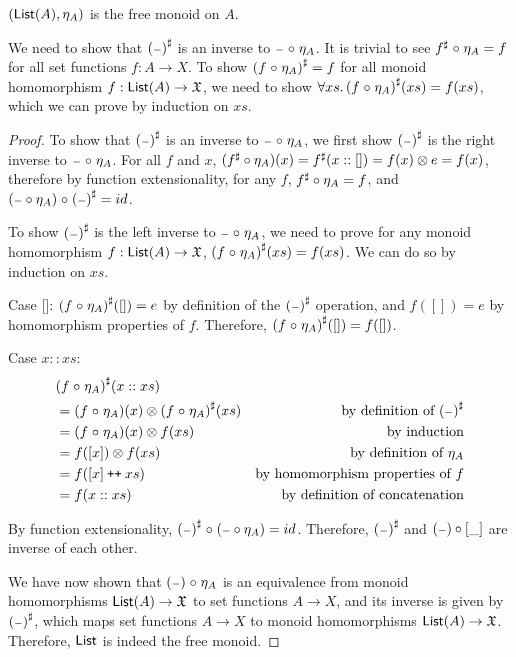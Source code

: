 \begin{propositionrep}
    $(\operatorname{\mathsf{List}}(A),\eta_A)$ is the free monoid on $A$.
\end{propositionrep}

\begin{proofsketch}
    We need to show that ${({\scriptstyle{-}})}^{\sharp}$ is an inverse to ${\scriptstyle{-}} \mathrel{\circ} \eta_A$.
    It is trivial to see ${f}^{\sharp} \mathrel{\circ} \eta_A = f$ for all set functions $f : A \to X$.
    To show ${(f \mathrel{\circ} \eta_A)}^{\sharp} = f$ for all monoid homomorphism $f : \operatorname{\mathsf{List}}(A) \to \mathfrak{X}$,
    we need to show $\forall xs.\, {(f \mathrel{\circ} \eta_A)}^{\sharp}(xs) = f(xs)$, which we can prove by induction on $xs$.
\end{proofsketch}

\begin{proof}
    To show that ${({\scriptstyle{-}})}^{\sharp}$ is an inverse to ${\scriptstyle{-}} \mathrel{\circ} \eta_A$,
    we first show ${({\scriptstyle{-}})}^{\sharp}$ is the right inverse to ${\scriptstyle{-}} \mathrel{\circ} \eta_A$.
    For all $f$ and $x$, $({f}^{\sharp} \circ \eta_A)(x) = {f}^{\sharp}(x :: []) = f(x) \otimes e = f(x)$,
    therefore by function extensionality, for any $f$, ${f}^{\sharp} \circ \eta_A = f$,
    and $({\scriptstyle{-}} \circ \eta_A) \mathrel{\circ} {({\scriptstyle{-}})}^{\sharp} = id$.
    
    To show ${({\scriptstyle{-}})}^{\sharp}$ is the left inverse to ${\scriptstyle{-}} \mathrel{\circ} \eta_A$, we need to prove
    for any monoid homomorphism $f : \operatorname{\mathsf{List}}(A) \to \mathfrak{X}$, ${(f \mathrel{\circ} \eta_A)}^{\sharp}(xs) = f(xs)$.
    We can do so by induction on $xs$.

    Case []: ${(f \mathrel{\circ} \eta_A)}^{\sharp}([]) = e$ by definition of the ${({\scriptstyle{-}})}^{\sharp}$ operation,
    and $f([]) = e$ by homomorphism properties of $f$. Therefore, ${(f \mathrel{\circ} \eta_A)}^{\sharp}([]) = f([])$.

    Case $x :: xs$: 
    \begin{align*}
        & {(f \mathrel{\circ} \eta_A)}^{\sharp}(x :: xs) \\
        & = (f \mathrel{\circ} \eta_A)(x) \otimes {(f \mathrel{\circ}\eta_A)}^{\sharp}(xs) & \text{by definition of ${({\scriptstyle{-}})}^{\sharp}$} \\
        & = (f \mathrel{\circ} \eta_A)(x) \otimes f(xs) & \text{by induction} \\
        & = f([x]) \otimes f(xs) & \text{by definition of $\eta_A$} \\
        & = f([x] \mathbin{\text{\ttfamily\upshape ++}} xs) & \text{by homomorphism properties of $f$} \\
        & = f(x :: xs) & \text{by definition of concatenation}
    \end{align*}

    By function extensionality, ${({\scriptstyle{-}})}^{\sharp} \mathrel{\circ} ({\scriptstyle{-}} \circ \eta_A) = id$.
    Therefore, ${({\scriptstyle{-}})}^{\sharp}$ and $({\scriptstyle{-}}) \circ [\_]$ are inverse of each other.

    We have now shown that $({\scriptstyle{-}}) \mathrel{\circ} \eta_A$ is an equivalence from
    monoid homomorphisms $\operatorname{\mathsf{List}}(A) \to \mathfrak{X}$
    to set functions $A \to X$, and its inverse is given by ${({\scriptstyle{-}})}^{\sharp}$, which maps set
    functions $A \to X$ to monoid homomorphisms $\operatorname{\mathsf{List}}(A) \to \mathfrak{X}$. Therefore, $\operatorname{\mathsf{List}}$ is indeed
    the free monoid.
    
\end{proof}
